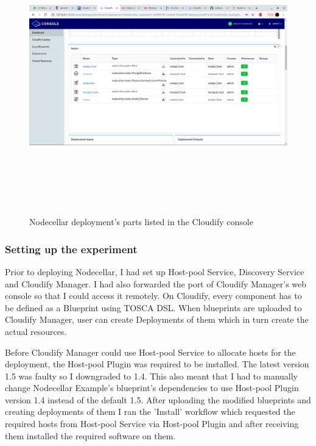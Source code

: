  \begin{figure}[ht!]
\centering
  \includegraphics[width=12cm,height=12cm, keepaspectratio]{console_list.png}%
  \caption{Nodecellar deployment's parts listed in the Cloudify console}
  \label{fig:console_list}
\end{figure}

\subsubsection*{Setting up the experiment}

Prior to deploying Nodecellar, I had set up Host-pool Service, Discovery Service and Cloudify Manager. I had also forwarded the port of Cloudify Manager's web console so that I could access it remotely. On Cloudify, every component has to be defined as a Blueprint using TOSCA DSL. When blueprints are uploaded to Cloudify Manager, user can create Deployments of them which in turn create the actual resources.

Before Cloudify Manager could use Host-pool Service to allocate hosts for the deployment, the Host-pool Plugin was required to be installed. The latest version 1.5 was faulty so I downgraded to 1.4. This also meant that I had to manually change Nodecellar Example's blueprint's dependencies to use Host-pool Plugin version 1.4 instead of the default 1.5. After uploading the modified blueprints and creating deployments of them I ran the 'Install' workflow which requested the required hosts from Host-pool Service via Host-pool Plugin and after receiving them installed the required software on them.

